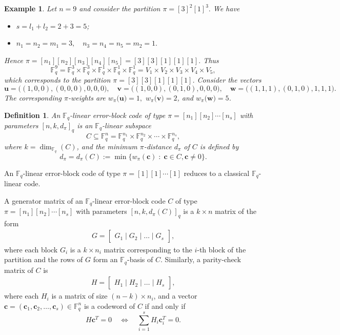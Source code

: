 \documentclass[11pt]{article}
\newtheorem{Definition}[Theorem]{Definition}
\newtheorem{Example}[Theorem]{Example}
\newtheorem{Definition and Notation}[Theorem]{Definition and Notation}
\begin{document}
\begin{Example}
 Let $n = 9$ and consider the partition $\pi = [3]^2[1]^3.$
We have
\begin{itemize}
    \item  $s = l_1 + l_2 = 2 + 3 = 5$;
    \item $ n_1 = n_2 = m_1 = 3, \quad n_3 = n_4 = n_5 = m_2 = 1. $   
\end{itemize}
Hence $\pi = [n_1][n_2][n_3][n_4][n_5]=[3][3][1][1][1].$ Thus
$$
\mathbb{F}_q^9
= \mathbb{F}_q^{3} \times \mathbb{F}_q^{3} \times \mathbb{F}_q^{1} \times \mathbb{F}_q^{1} \times \mathbb{F}_q^{1}
= V_1 \times V_2 \times V_3 \times V_4 \times V_5,
$$
which corresponds to the partition $\pi=[3][3][1][1][1]$. Consider the vectors
$$\boldsymbol{u} = \Big((1,0,0), (0,0,0), 0, 0, 0\Big),\quad \boldsymbol{v} = \Big((1,0,0), (0,1,0), 0, 0, 0\Big),\quad \boldsymbol{w} = \Big((1,1,1), (0,1,0), 1, 1, 1\Big).$$
The corresponding $\pi$-weights are $ w_\pi\big(\boldsymbol{u}\big)=1,$  $w_\pi\big( \boldsymbol{v}\big)=2$, and $w_\pi\big(\boldsymbol{w}\big)=5$.
\end{Example}

\begin{Definition}
An $\mathbb{F}_q$-linear error-block code of type $\pi=[n_1][n_2]\cdots[n_s]$ with parameters $[n, k, d_{\pi}]_q$ is an $\mathbb{F}_q$-linear subspace
$$
C \subseteq \mathbb{F}_q^n= \mathbb{F}_q^{n_1} \times \mathbb{F}_q^{n_2} \times \cdots \times \mathbb{F}_q^{n_s},
$$
where $k = \dim_{\mathbb{F}_q}(C)$, and the minimum $\pi$-distance $d_{\pi}$ of $C$ is defined by
$$
d_{\pi} = d_{\pi}(C):=\min \{ w_\pi(\boldsymbol{c}) \;:\; \boldsymbol{c} \in C, \boldsymbol{c} \ne 0 \}.
$$
\end{Definition}
An $\mathbb F_q$-linear error-block code of type $\pi = [1][1]\cdots[1]$ reduces to a classical $\mathbb{F}_q$-linear code. 

A generator matrix of an $\mathbb F_q$-linear error-block code $C$ of type $\pi = [n_1][n_2]\cdots[n_s]$ with parameters $[n,k,d_\pi(C)]_q$ is a $k \times n$ matrix of the form
\begin{align}\label{generator}
    G = \begin{bmatrix}
G_1 \mid G_2 \mid \dots \mid G_s
\end{bmatrix},
\end{align}
where each block $G_i$ is a $k \times n_i$ matrix corresponding to the $i$-th block of the partition and the rows of $G$ form an $\mathbb{F}_q$-basis of $C$. Similarly, a parity-check matrix of $C$ is
\begin{align}\label{parity}
    H = \begin{bmatrix}
H_1 \mid H_2 \mid \dots \mid H_s
\end{bmatrix},
\end{align}
where each $H_i$ is a matrix of size $(n - k) \times n_i$, and a vector $\boldsymbol{c} = (\boldsymbol{c}_1, \boldsymbol{c}_2, \dots, \boldsymbol{c}_s) \in \mathbb{F}_q^n$ is a codeword of $C$ if and only if
$$
H \boldsymbol{c}^T = 0
\quad \Longleftrightarrow \quad
\sum_{i=1}^{s} H_i \boldsymbol{c}_i^T = 0.
$$
\end{document}
